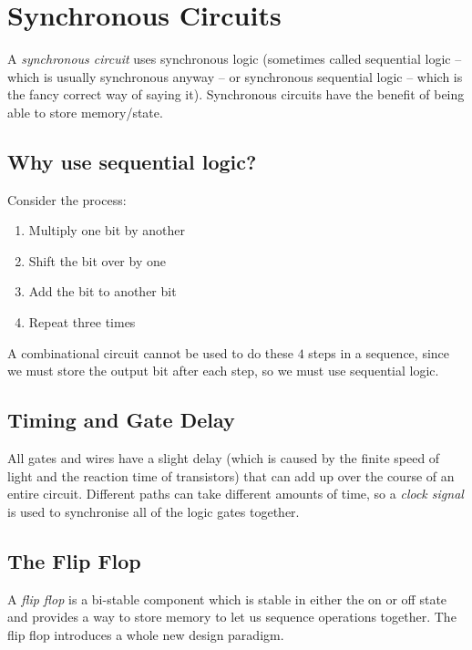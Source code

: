 \section{Synchronous Circuits}\label{sec:synchronous_circuits}

A \emph{synchronous circuit} uses synchronous logic (sometimes called sequential logic -- which is usually synchronous anyway -- or synchronous sequential logic -- which is the fancy correct way of saying it).
Synchronous circuits have the benefit of being able to store memory/state.


\subsection{Why use sequential logic?}\label{sub:why_use_sequential_logic_}

Consider the process:

\begin{enumerate}
    \item Multiply one bit by another
    \item Shift the bit over by one
    \item Add the bit to another bit
    \item Repeat three times
\end{enumerate}
%
A combinational circuit cannot be used to do these \(4\) steps in a sequence, since we must store the output bit after each step, so we must use sequential logic.

\subsection{Timing and Gate Delay}\label{sub:timing_and_gate_delay}

All gates and wires have a slight delay (which is caused by the finite speed of light and the reaction time of transistors) that can add up over the course of an entire circuit.
Different paths can take different amounts of time, so a \emph{clock signal} is used to synchronise all of the logic gates together.

\subsection{The Flip Flop}\label{sub:the_flip_flop}

A \emph{flip flop} is a bi-stable component which is stable in either the on or off state and provides a way to store memory to let us sequence operations together.
The flip flop introduces a whole new design paradigm.

